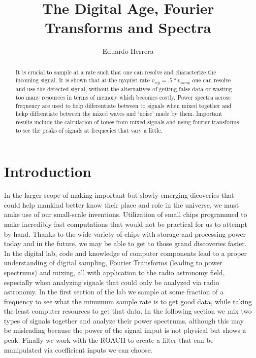 \documentclass[12 pt]{article}
\begin{document}
\title{The Digital Age, Fourier Transforms and Spectra}
\author{Eduardo Herrera}

\maketitle

\begin{abstract} 
It is crucial to sample at a rate such that one can resolve and
characterize the incoming signal. It is shown that at the nyquist rate
$v_{sig}=.5*v_{samp}$ one can resolve and use the detected signal, without the
alternatives of getting false data or wasting too many resources in
terms of memory which becomes costly. Power spectra
across frequency are used to help differentiate between to signals
when mixed together and hekp diffrentiate between the mixed waves and
`noise' made by them. Important results include the calculation of tones
from mixed signals and using fourier transforms to see the peaks of
signals at frequecies that vary a little. 

\end{abstract}

\section{Introduction}
In the larger scope of making important but slowly emerging dicoveries that could help
mankind better know their place and role in the universe, we must amke
use of our small-scale inventions.
Utilization of small chips programmed to make incredibly fast computations that
would not be practical for us to attempt by hand. Thanks to the wide variety
of chips with storage and processing power today and in the future, we
may be able to get to those grand discoveries faster. In the digital
lab, code and knowledge of computer components lead to a proper
understanding of digital sampling, Fourier Transforms (leading to power
spectrums) and mixing, all with application to the radio astronomy
field, especially when analyzing signals that could only be analyzed via
radio astronomy. In the first section of the lab we sample at
some fraction of a frequency to see what the minumum sample rate is to
get good data, while taking the least computer resources to get that
data. In the following section we mix two types of signals together and
analyze their power spectrums, although this may be misleading because
the power of the signal imput is not physical but shows a peak.
Finally we work with the ROACH to create a filter that can be
manipulated via coefficient inputs we can choose.
\end{document}
